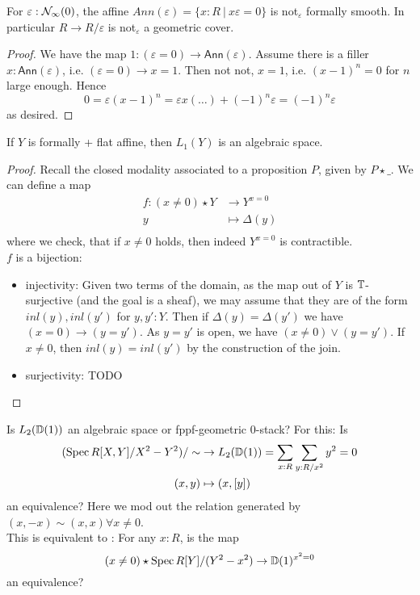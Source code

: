 \documentclass{article}
\newcommand{\Ann}{\mathsf{Ann}}
\begin{document}
\begin{lemma}
	For $\varepsilon : \mathcal{N}_\infty(0)$, the affine $Ann(\varepsilon) = \{x : R \ | \  x \varepsilon = 0 \}$ is not$_\varepsilon$ formally smooth. In particular $R \to R / \varepsilon$ is not$_\varepsilon$ a geometric cover.
\end{lemma}
\begin{proof}
	We have the map $1 : (\varepsilon = 0) \to \Ann(\varepsilon)$. Assume there is a filler $x : \Ann(\varepsilon)$, i.e. $(\varepsilon = 0) \to x = 1$. Then not not, $x = 1$, i.e. $(x-1)^n = 0$ for $n$ large enough. Hence
	\[
	0 = \varepsilon (x-1)^n = \varepsilon x (\hdots) + (-1)^n \varepsilon = (-1)^n \varepsilon
	\]
	as desired.
\end{proof}


\begin{lemma}[TODO]
	If $Y$ is formally \etale + flat affine, then $L_1(Y)$ is an algebraic space.
\end{lemma}
\begin{proof}
	Recall the closed modality associated to a proposition $P$, given by $P \star \_$.
	We can define a map
	\begin{align*}
		f : (x \neq 0) \star Y &\to Y^{x = 0} \\
		y &\mapsto \Delta (y) \\
	\end{align*}
	where we check, that if $x \neq 0$ holds, then indeed $Y^{x = 0}$ is contractible. \\
	
	$f$ is a bijection: \\
	\begin{itemize}
		\item injectivity: Given two terms of the domain, as the map out of $Y$ is $\mathbb{T}$-surjective (and the goal is a sheaf), we may assume that they are of the form $inl(y) , inl(y')$ for $y,y' : Y$. Then if $\Delta(y) = \Delta(y')$ we have $(x = 0) \to (y = y')$. As $y = y'$ is open, we have $(x \neq 0) \lor (y = y')$. If $x \neq 0$, then $inl(y) = inl(y')$ by the construction of the join.
		\item surjectivity: TODO
	\end{itemize}
	
\end{proof}
\begin{question}
	Is $L_2(\mathbb{D}(1))$ an algebraic space or fppf-geometric 0-stack? For this:
	Is 
	\begin{align*}
		(\operatorname{Spec} R[X,Y] / X^2 - Y^2)/\sim &\to L_2(\mathbb{D}(1)) = \sum_{x : R} \sum_{y : R /x^2} y^2 = 0 \\
		(x,y) &\mapsto (x , [y])
	\end{align*}
	an equivalence? Here we mod out the relation generated by $(x,-x) \sim (x,x) \forall x \neq 0$. \\
	
	This is equivalent to : For any $x : R$, is the map
	\[
	(x \neq 0) \star \operatorname{Spec} R[Y] / (Y^2 - x^2) \to \mathbb{D}(1)^{x^2 = 0}
	\]
	an equivalence?
\end{question}
\end{document}
